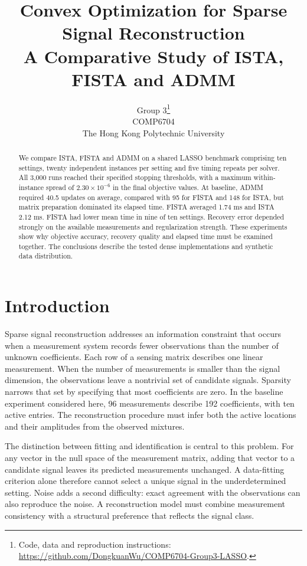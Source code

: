 \documentclass{article}
\title{Convex Optimization for Sparse Signal Reconstruction\\A Comparative Study of ISTA, FISTA and ADMM}
\author{Group 3\thanks{Code, data and reproduction instructions: \url{https://github.com/DongkuanWu/COMP6704-Group3-LASSO}.}\\COMP6704\\The Hong Kong Polytechnic University}
\begin{document}
\raggedbottom
\maketitle
\begin{abstract}
We compare ISTA, FISTA and ADMM on a shared LASSO benchmark comprising ten settings, twenty independent instances per setting and five timing repeats per solver. All 3,000 runs reached their specified stopping thresholds, with a maximum within-instance spread of $2.30\times10^{-6}$ in the final objective values. At baseline, ADMM required 40.5 updates on average, compared with 95 for FISTA and 148 for ISTA, but matrix preparation dominated its elapsed time. FISTA averaged 1.74 ms and ISTA 2.12 ms. FISTA had lower mean time in nine of ten settings. Recovery error depended strongly on the available measurements and regularization strength. These experiments show why objective accuracy, recovery quality and elapsed time must be examined together. The conclusions describe the tested dense implementations and synthetic data distribution.
\end{abstract}

\section{Introduction}
Sparse signal reconstruction addresses an information constraint that occurs when a measurement system records fewer observations than the number of unknown coefficients. Each row of a sensing matrix describes one linear measurement. When the number of measurements is smaller than the signal dimension, the observations leave a nontrivial set of candidate signals. Sparsity narrows that set by specifying that most coefficients are zero. In the baseline experiment considered here, 96 measurements describe 192 coefficients, with ten active entries. The reconstruction procedure must infer both the active locations and their amplitudes from the observed mixtures.

The distinction between fitting and identification is central to this problem. For any vector in the null space of the measurement matrix, adding that vector to a candidate signal leaves its predicted measurements unchanged. A data-fitting criterion alone therefore cannot select a unique signal in the underdetermined setting. Noise adds a second difficulty: exact agreement with the observations can also reproduce the noise. A reconstruction model must combine measurement consistency with a structural preference that reflects the signal class.
\end{document}

